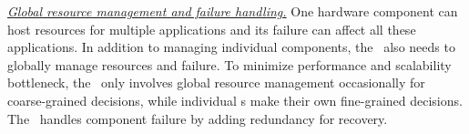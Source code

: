 \textit{\uline{Global resource management and failure handling.}}
One hardware component can host resources for multiple applications and its failure can affect all these applications.
In addition to managing individual components, the \splitkernel\ also needs to 
globally manage resources and failure.
To minimize performance and scalability bottleneck,
the \splitkernel\ only involves global resource management occasionally for coarse-grained decisions, 
while individual \microos{}s make their own fine-grained decisions.
The \splitkernel\ handles component failure by adding redundancy for recovery.
